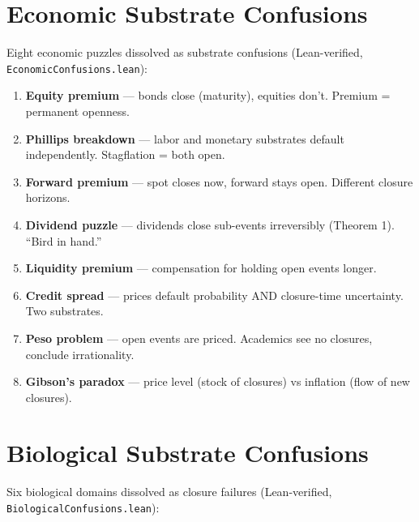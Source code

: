 \documentclass[11pt]{article}
\begin{document}
\clearpage

\section{Economic Substrate Confusions}

Eight economic puzzles dissolved as substrate confusions (Lean-verified, \texttt{EconomicConfusions.lean}):

\begin{enumerate}
\item \textbf{Equity premium} --- bonds close (maturity), equities don't. Premium = permanent openness.
\item \textbf{Phillips breakdown} --- labor and monetary substrates default independently. Stagflation = both open.
\item \textbf{Forward premium} --- spot closes now, forward stays open. Different closure horizons.
\item \textbf{Dividend puzzle} --- dividends close sub-events irreversibly (Theorem 1). ``Bird in hand.''
\item \textbf{Liquidity premium} --- compensation for holding open events longer.
\item \textbf{Credit spread} --- prices default probability AND closure-time uncertainty. Two substrates.
\item \textbf{Peso problem} --- open events are priced. Academics see no closures, conclude irrationality.
\item \textbf{Gibson's paradox} --- price level (stock of closures) vs inflation (flow of new closures).
\end{enumerate}


\clearpage

\section{Biological Substrate Confusions}

Six biological domains dissolved as closure failures (Lean-verified, \texttt{BiologicalConfusions.lean}):
\end{document}
